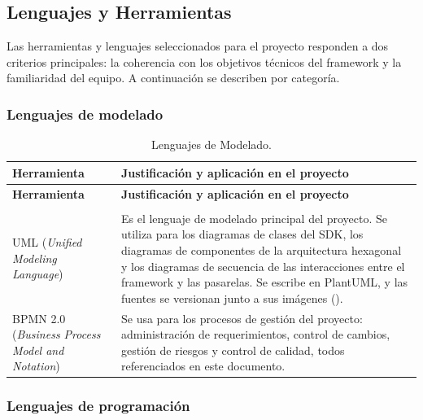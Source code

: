 \subsection{Lenguajes y Herramientas}

Las herramientas y lenguajes seleccionados para el proyecto responden a dos criterios principales: la coherencia con los objetivos técnicos del framework y la familiaridad del equipo. A continuación se describen por categoría.

\subsubsection{Lenguajes de modelado}

\begin{center}
\renewcommand{\arraystretch}{1.2}
\begin{longtable}{|P{0.5}|P{0.5}|}
  \hline
  \textbf{Herramienta} & \textbf{Justificación y aplicación en el proyecto} \\
  \hline
  \endfirsthead
  \hline
  \textbf{Herramienta} & \textbf{Justificación y aplicación en el proyecto} \\
  \hline
  \endhead
  \caption{Lenguajes de Modelado.}
  \label{tab:lenguajes-modelado}\\
  \endlastfoot
  UML (\textit{Unified Modeling Language}) & Es el lenguaje de modelado principal del proyecto. Se utiliza para los diagramas de clases del SDK, los diagramas de componentes de la arquitectura hexagonal y los diagramas de secuencia de las interacciones entre el framework y las pasarelas. Se escribe en PlantUML, y las fuentes se versionan junto a sus imágenes (). \\
  \hline
  BPMN 2.0 (\textit{Business Process Model and Notation}) & Se usa para los procesos de gestión del proyecto: administración de requerimientos, control de cambios, gestión de riesgos y control de calidad, todos referenciados en este documento. \\
  \hline
\end{longtable}
\end{center}

\subsubsection{Lenguajes de programación}

